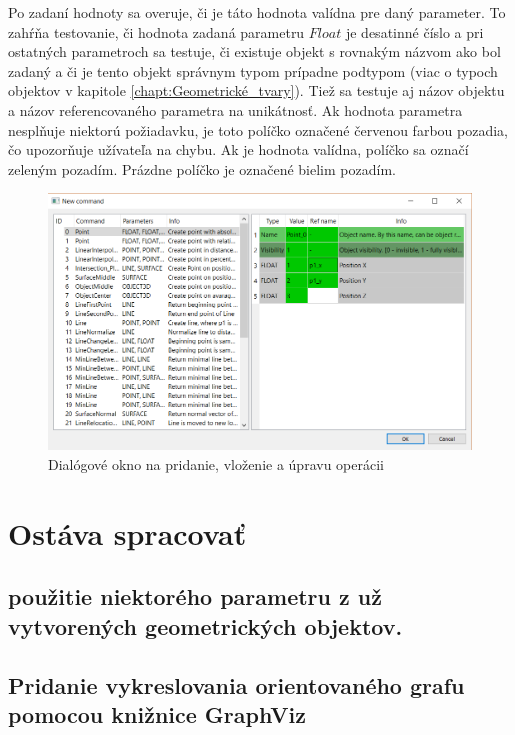 Po zadaní hodnoty sa overuje, či je táto hodnota valídna pre daný parameter. To zahŕňa testovanie, či hodnota zadaná parametru $Float$ je desatinné číslo a pri ostatných parametroch sa testuje, či existuje objekt s rovnakým názvom ako bol zadaný a či je tento objekt správnym typom prípadne podtypom (viac o typoch objektov v kapitole  \ref{chapt:Geometrické_tvary}). Tiež sa testuje aj názov objektu a názov referencovaného parametra na unikátnosť.
Ak hodnota parametra nesplňuje niektorú požiadavku, je toto políčko označené červenou farbou pozadia, čo upozorňuje užívateľa na chybu. Ak je hodnota valídna, políčko sa označí zeleným pozadím. Prázdne políčko je označené bielim pozadím. 

\begin{figure}[hbt]
	\centering
	\includegraphics[width=1\textwidth]{obrazky-figures/Dialog.png}
	\caption{Dialógové okno na pridanie, vloženie a úpravu operácii}
	\label{fig:dialogWindow}
\end{figure}

\chapter{Ostáva spracovať}



\section{použitie niektorého parametru z už vytvorených geometrických objektov.}


\section{Pridanie vykreslovania orientovaného grafu pomocou knižnice GraphViz}




